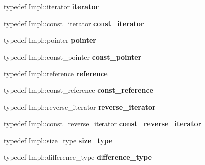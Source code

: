 \begin{DoxyCompactItemize}
\item 
typedef Impl\+::iterator {\bfseries iterator}\hypertarget{classpriority__list_a781961af28ba78cbdb088cc78cb46a96}{}\label{classpriority__list_a781961af28ba78cbdb088cc78cb46a96}

\item 
typedef Impl\+::const\+\_\+iterator {\bfseries const\+\_\+iterator}\hypertarget{classpriority__list_a9ef2a8b723496ef098f6fb4b5dec88aa}{}\label{classpriority__list_a9ef2a8b723496ef098f6fb4b5dec88aa}

\item 
typedef Impl\+::pointer {\bfseries pointer}\hypertarget{classpriority__list_ac6b909f3cf4fc14e7c7f2ea7617da950}{}\label{classpriority__list_ac6b909f3cf4fc14e7c7f2ea7617da950}

\item 
typedef Impl\+::const\+\_\+pointer {\bfseries const\+\_\+pointer}\hypertarget{classpriority__list_acb4e535ddbf4a39b52013a557b8a9471}{}\label{classpriority__list_acb4e535ddbf4a39b52013a557b8a9471}

\item 
typedef Impl\+::reference {\bfseries reference}\hypertarget{classpriority__list_a7bff47cfd517097e2a525e4823ff8946}{}\label{classpriority__list_a7bff47cfd517097e2a525e4823ff8946}

\item 
typedef Impl\+::const\+\_\+reference {\bfseries const\+\_\+reference}\hypertarget{classpriority__list_a0b5c652b73ae76e978583d878a368886}{}\label{classpriority__list_a0b5c652b73ae76e978583d878a368886}

\item 
typedef Impl\+::reverse\+\_\+iterator {\bfseries reverse\+\_\+iterator}\hypertarget{classpriority__list_adfc62cdbcc79e97f990d97600d677e9b}{}\label{classpriority__list_adfc62cdbcc79e97f990d97600d677e9b}

\item 
typedef Impl\+::const\+\_\+reverse\+\_\+iterator {\bfseries const\+\_\+reverse\+\_\+iterator}\hypertarget{classpriority__list_a4641264bdf7e8e8cecf37153904c3256}{}\label{classpriority__list_a4641264bdf7e8e8cecf37153904c3256}

\item 
typedef Impl\+::size\+\_\+type {\bfseries size\+\_\+type}\hypertarget{classpriority__list_a6d84ba4d1299d1826cc3e4b8047d71d6}{}\label{classpriority__list_a6d84ba4d1299d1826cc3e4b8047d71d6}

\item 
typedef Impl\+::difference\+\_\+type {\bfseries difference\+\_\+type}\hypertarget{classpriority__list_a8ca0ce2ffaf2c463faaf2397d71e1668}{}\label{classpriority__list_a8ca0ce2ffaf2c463faaf2397d71e1668}

\end{DoxyCompactItemize}
